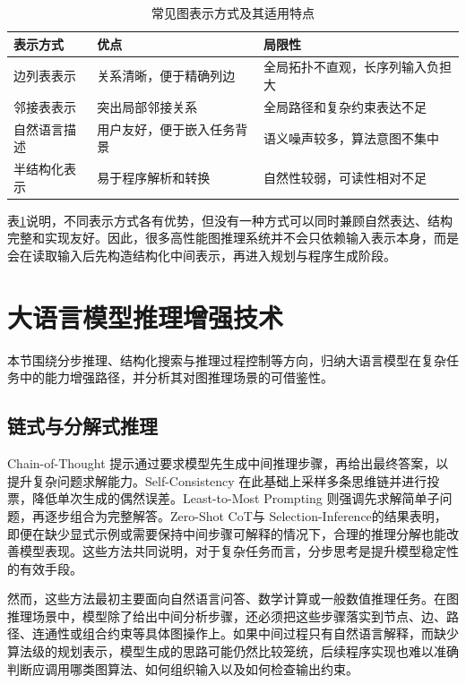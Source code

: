 \begin{table}[htbp]
\centering
\small
\caption{常见图表示方式及其适用特点}
\label{tab:graph_representation}
\renewcommand{\arraystretch}{1.15}
\begin{tabularx}{\textwidth}{
>{\raggedright\arraybackslash}p{2.6cm}
>{\raggedright\arraybackslash}X
>{\raggedright\arraybackslash}X}
\toprule
表示方式 & 优点 & 局限性 \\
\midrule
边列表表示 & 关系清晰，便于精确列边 & 全局拓扑不直观，长序列输入负担大 \\
邻接表表示 & 突出局部邻接关系 & 全局路径和复杂约束表达不足 \\
自然语言描述 & 用户友好，便于嵌入任务背景 & 语义噪声较多，算法意图不集中 \\
半结构化表示 & 易于程序解析和转换 & 自然性较弱，可读性相对不足 \\
\bottomrule
\end{tabularx}
\end{table}

表\ref{tab:graph_representation}说明，不同表示方式各有优势，但没有一种方式可以同时兼顾自然表达、结构完整和实现友好。因此，很多高性能图推理系统并不会只依赖输入表示本身，而是会在读取输入后先构造结构化中间表示，再进入规划与程序生成阶段。

\section{大语言模型推理增强技术}

本节围绕分步推理、结构化搜索与推理过程控制等方向，归纳大语言模型在复杂任务中的能力增强路径，并分析其对图推理场景的可借鉴性。

\subsection{链式与分解式推理}

Chain-of-Thought 提示通过要求模型先生成中间推理步骤，再给出最终答案，以提升复杂问题求解能力\cite{wei2022chain}。Self-Consistency 在此基础上采样多条思维链并进行投票，降低单次生成的偶然误差\cite{wang2023selfconsistency}。Least-to-Most Prompting 则强调先求解简单子问题，再逐步组合为完整解答\cite{zhou2023least}。Zero-Shot CoT\cite{kojima2022zeroshot}与 Selection-Inference\cite{creswell2023selection}的结果表明，即便在缺少显式示例或需要保持中间步骤可解释的情况下，合理的推理分解也能改善模型表现。这些方法共同说明，对于复杂任务而言，分步思考是提升模型稳定性的有效手段。

然而，这些方法最初主要面向自然语言问答、数学计算或一般数值推理任务。在图推理场景中，模型除了给出中间分析步骤，还必须把这些步骤落实到节点、边、路径、连通性或组合约束等具体图操作上。如果中间过程只有自然语言解释，而缺少算法级的规划表示，模型生成的思路可能仍然比较笼统，后续程序实现也难以准确判断应调用哪类图算法、如何组织输入以及如何检查输出约束。

